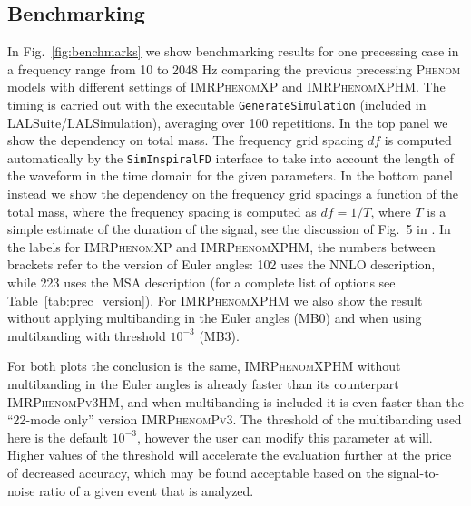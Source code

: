 \documentclass[%
aps,
prd,
amssymb,
amsmath,
amsfonts,
eqsecnum,
showpacs,
nofootinbib,
floatfix,
twocolumn,
twoside,
a4paper,
superscriptaddress
]{revtex4-1}
\newcommand{\phPvthree}{\textsc{IMRPhenomPv3}\xspace}
\newcommand{\phPvthreehm}{\textsc{IMRPhenomPv3HM}\xspace}
\newcommand{\phXP}{\textsc{IMRPhenomXP}\xspace}
\newcommand{\phXPHM}{\textsc{IMRPhenomXPHM}\xspace}
\newcommand{\ph}{\textsc{Phenom}\xspace}
\begin{document}
\subsection{Benchmarking}\label{sec:benchmarks}

In Fig.~\ref{fig:benchmarks} we show benchmarking results for one precessing case in a frequency range from 10 to 2048 Hz comparing the previous precessing \ph models with different settings of \phXP and \phXPHM. The timing is carried out with the executable \texttt{GenerateSimulation} (included in LALSuite/LALSimulation), averaging over 100 repetitions. In the top panel we show the dependency on total mass. The frequency grid spacing $df$ is computed automatically by the \texttt{SimInspiralFD} interface to take into account the length of the waveform in the time domain for the given parameters. In the bottom panel instead we show the dependency on the frequency grid spacings a function of the total mass, where the frequency spacing is computed as $df=1/T$, where $T$
is a simple estimate of the duration of the signal, see the discussion of Fig.~5 in \cite{Garcia-Quiros:2020qlt}. In the labels for \phXP and \phXPHM, the numbers between brackets refer to the version of Euler angles: 102 uses the NNLO description, while 223 uses the MSA description (for a complete list of options see Table~\ref{tab:prec_version}). For \phXPHM we also show the result without applying multibanding in the Euler angles (MB0) and when using multibanding with threshold $10^{-3}$ (MB3).

For both plots the conclusion is the same, \phXPHM without multibanding in the Euler angles is already faster than its counterpart \phPvthreehm, and when multibanding is included it is even faster than the ``22-mode only'' version \phPvthree. The threshold of the multibanding used here is the default $10^{-3}$, however the user can modify this parameter at will. Higher values of the threshold will accelerate the evaluation further at the price of decreased accuracy, which may be found acceptable based on the signal-to-noise ratio of a given event that is analyzed.
\end{document}
